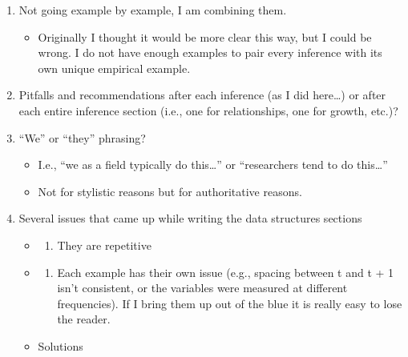\documentclass[english,,man]{apa6}
\providecommand{\tightlist}{%
  \setlength{\itemsep}{0pt}\setlength{\parskip}{0pt}}
\theoremstyle{definition}
\theoremstyle{definition}
\theoremstyle{definition}
\theoremstyle{remark}
\begin{document}
\begin{enumerate}
\def\labelenumi{\arabic{enumi})}
\item
  Not going example by example, I am combining them.

  \begin{itemize}
  \tightlist
  \item
    Originally I thought it would be more clear this way, but I could be
    wrong. I do not have enough examples to pair every inference with
    its own unique empirical example.
  \end{itemize}
\item
  Pitfalls and recommendations after each inference (as I did
  here\ldots{}) or after each entire inference section (i.e., one for
  relationships, one for growth, etc.)?
\item
  \enquote{We} or \enquote{they} phrasing?

  \begin{itemize}
  \item
    I.e., \enquote{we as a field typically do this\ldots{}} or
    \enquote{researchers tend to do this\ldots{}}
  \item
    Not for stylistic reasons but for authoritative reasons.
  \end{itemize}
\item
  Several issues that came up while writing the data structures sections

  \begin{itemize}
  \item
    \begin{enumerate}
    \def\labelenumii{\arabic{enumii})}
    \tightlist
    \item
      They are repetitive
    \end{enumerate}
  \item
    \begin{enumerate}
    \def\labelenumii{\arabic{enumii})}
    \setcounter{enumii}{1}
    \tightlist
    \item
      Each example has their own issue (e.g., spacing between t and t +
      1 isn't consistent, or the variables were measured at different
      frequencies). If I bring them up out of the blue it is really easy
      to lose the reader.
    \end{enumerate}
  \item
    Solutions


\end{itemize}
\end{enumerate}
\end{document}
